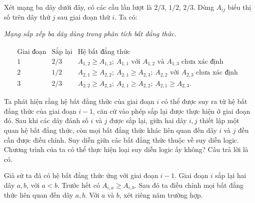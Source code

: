 \documentclass[11pt]{article}
\begin{document}
Xét mạng ba dây dưới đây, có các cầu lần lượt là \(2/3\), \(1/2\), \(2/3\).
Dùng \(A_{ij}\) biểu thị số trên dây thứ \(j\) sau giai đoạn thứ
\(i\). Ta có:

\begin{center}

\smallskip
\textit{Mạng sắp xếp ba dây dùng trong phân tích bất đẳng thức.}
\end{center}

\[
\begin{array}{c|c|l}
\text{Giai đoạn} & \text{Sắp lại} & \text{Hệ bất đẳng thức}\\
\hline
1 & 2/3 &
A_{1,2}\ge A_{1,3};\ A_{1,1}\text{ với }A_{1,2}\text{ và }A_{1,3}\text{ chưa xác định}\\
2 & 1/2 &
A_{2,1}\ge A_{2,2};\ A_{2,1}\ge A_{2,3};\ A_{2,2}\text{ với }A_{2,3}\text{ chưa xác định}\\
3 & 2/3 &
A_{2,2}\ge A_{2,3};\ A_{2,1}\ge A_{2,2};\ A_{2,1}\ge A_{2,3}.
\end{array}
\]

Ta phát hiện rằng hệ bất đẳng thức của giai đoạn \(i\) có thể được suy ra từ
hệ bất đẳng thức của giai đoạn \(i-1\), căn cứ vào phép sắp lại được thực
hiện ở giai đoạn đó. Sau khi các dây đánh số \(i\) và \(j\) được sắp lại,
giữa hai dây \(i,j\) thiết lập một quan hệ bất đẳng thức, còn mọi bất đẳng
thức khác liên quan đến dây \(i\) và \(j\) đều cần được điều chỉnh. Suy diễn
giữa các bất đẳng thức thuộc về suy diễn logic. Chương trình của ta có thể
thực hiện loại suy diễn logic ấy không? Câu trả lời là có.

Giả sử ta đã có hệ bất đẳng thức ứng với giai đoạn \(i-1\). Giai đoạn \(i\)
sắp lại hai dây \(a,b\), với \(a<b\). Trước hết có \(A_{i,a}\ge A_{i,b}\).
Sau đó ta điều chỉnh mọi bất đẳng thức liên quan đến dây \(a,b\). Với \(a\)
và \(b\), xét riêng năm trường hợp.
\end{document}
